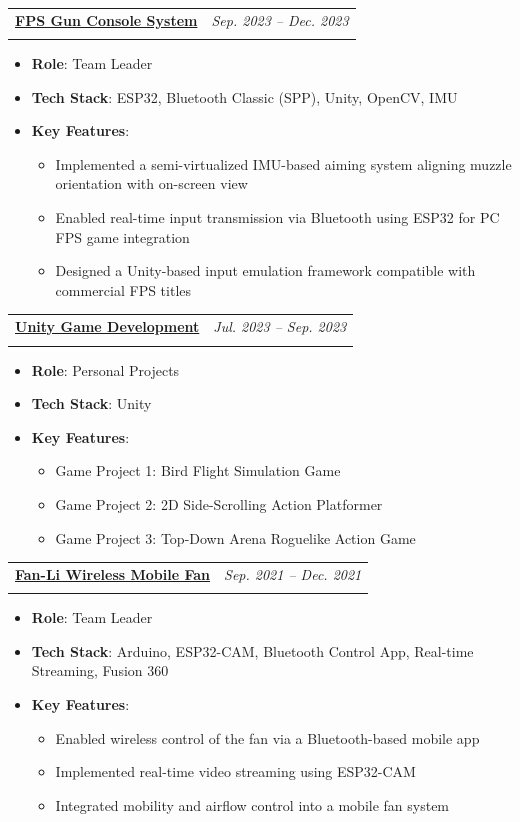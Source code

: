 \documentclass[a4paper,11pt]{article}
\makeatletter
\newcommand{\resumeProject}[4]{%
\item
    \begin{tabularx}{0.98\textwidth}[t]{@{}X>{\raggedleft\arraybackslash}p{4.1cm}@{}}
        \textbf{#1} & \textit{\footnotesize{#3}} \\
        \footnotesize{\textit{#2}} \if\relax\detokenize{#4}\relax\else\newline\footnotesize{#4}\fi &
    \end{tabularx}
}
\newcommand{\resumeItemListStart}{\begin{itemize}}
\newcommand{\resumeItemListEnd}{\end{itemize}}
\makeatother
\begin{document}
\resumeProject
{\href{https://moonshotfps1.notion.site/FPS-CONSOLE-PROJECT-1-efc70c403e4e4eee8b17e8ac6a4f5c15?pvs=74}{FPS Gun Console System}}
{}
{Sep. 2023 -- Dec. 2023}
{}
\vspace{-1.5em}
\resumeItemListStart
  \item \textbf{Role}: Team Leader
  \item \textbf{Tech Stack}: ESP32, Bluetooth Classic (SPP), Unity, OpenCV, IMU
  \item \textbf{Key Features}:
  \begin{itemize}[leftmargin=1.2em]
    \item Implemented a semi-virtualized IMU-based aiming system aligning muzzle orientation with on-screen view
    \item Enabled real-time input transmission via Bluetooth using ESP32 for PC FPS game integration
    \item Designed a Unity-based input emulation framework compatible with commercial FPS titles
  \end{itemize}
\resumeItemListEnd

\vspace{0.5em}

\resumeProject
{\href{https://www.youtube.com/shorts/RJIRCw1mdC4}{Unity Game Development}}
{}
{Jul. 2023 -- Sep. 2023}
{}
\vspace{-1.5em}
\resumeItemListStart
  \item \textbf{Role}: Personal Projects
  \item \textbf{Tech Stack}: Unity
  \item \textbf{Key Features}:
  \begin{itemize}[leftmargin=1.2em]
    \item Game Project 1: Bird Flight Simulation Game
    \item Game Project 2: 2D Side-Scrolling Action Platformer
    \item Game Project 3: Top-Down Arena Roguelike Action Game
  \end{itemize}
\resumeItemListEnd

\vspace{0.5em}

\resumeProject
{\href{https://www.youtube.com/watch?v=8pNXA40yGwk}{Fan-Li Wireless Mobile Fan}}
{}
{Sep. 2021 -- Dec. 2021}
{}
\vspace{-1.5em}
\resumeItemListStart
  \item \textbf{Role}: Team Leader
  \item \textbf{Tech Stack}: Arduino, ESP32-CAM, Bluetooth Control App, Real-time Streaming, Fusion 360
  \item \textbf{Key Features}:
  \begin{itemize}[leftmargin=1.2em, topsep=0pt, itemsep=0pt, parsep=0pt]
    \item Enabled wireless control of the fan via a Bluetooth-based mobile app
    \item Implemented real-time video streaming using ESP32-CAM
    \item Integrated mobility and airflow control into a mobile fan system
  \end{itemize}
\resumeItemListEnd
\end{document}
